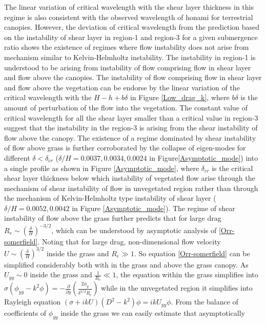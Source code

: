 \documentclass[aps,prl,twocolumn,showpacs,superscriptaddress,groupedaddress,10pt]{revtex4-1}  %
\newcommand{\del}{\partial}
\begin{document}
The linear variation of critical wavelength with the shear layer thickness in this regime is also consistent with the observed wavelength of honami for terrestrial canopies.
However, the deviation of critical wavelength from the prediction based on the instability of shear layer in region-1 and region-3 for a given submergence ratio shows the existence of 
regimes where flow instability does not arise from mechanism similar to Kelvin-Helmholtz instability. The instability in region-1 is understood to be arising from instability of flow
comprising flow in shear layer and flow above the canopies. The instability of flow comprising flow in shear layer and flow above the vegetation can be endorse by the linear 
variation of the critical wavelength with the $H-h+b\delta$ in Figure \ref{Low_drag_k}, where $b\delta$ is the amount of perturbation of the flow into the vegetation.
\newline
The constant value of critical wavelength for all the shear layer smaller than a critical value in region-3 suggest that the instability 
in the region-3 is arising from the shear instability of flow above the canopy. The existence of a regime dominated by shear instability of flow above grass is further corroborated 
by the collapse of eigen-modes for different $\delta<\delta_{cr}$ ($\delta/H=0.0037,0.0034,0.0024$ in Figure\ref{Asymptotic_mode}) into a single profile as shown in 
Figure \ref{Asymptotic_mode}, where $\delta_{cr}$ is the critical shear layer thickness
below which instability of vegetated flow arise through the mechanism of shear instability of flow in unvegetated region rather than through the mechanism of Kelvin-Helmholtz type 
instability of shear layer ($\delta/H=0.0052,0.0042$ in Figure \ref{Asymptotic_mode}). The regime of shear instability of flow above the 
grass further predicts that for large drag $R_e \sim (\frac{\delta}{H})^{-3/2}$, which can be understood by asymptotic analysis of \eqref{Orr-somerfield}.
Noting that for large drag, non-dimensional flow velocity $U \sim (\frac{\delta}{H})^{3/2}$ inside the grass and $R_{e} \gg 1$. So equation \eqref{Orr-somerfield}
can be simplified considerably both with in the grass and above the grass canopy. As $U_{yy}\sim 0$ inside the grass and $\frac{1}{R_e} \ll 1$,
the equation within the grass simplifies into
$\sigma\left(\phi_{yy}-k^2\phi\right) = -\frac{\del}{\del y}\left(\frac{2\phi_y}{\delta^{3/2}R_e}\right)$ while in the unvegetated region it simplifies into Rayleigh equation 
$ \left(\sigma+ikU\right) \left(D^2-k^2\right)\phi =  ikU_{yy}\phi$. From the balance of coefficients of $\phi_{yy}$ inside the grass we can easily estimate that asymptotically 
\end{document}
